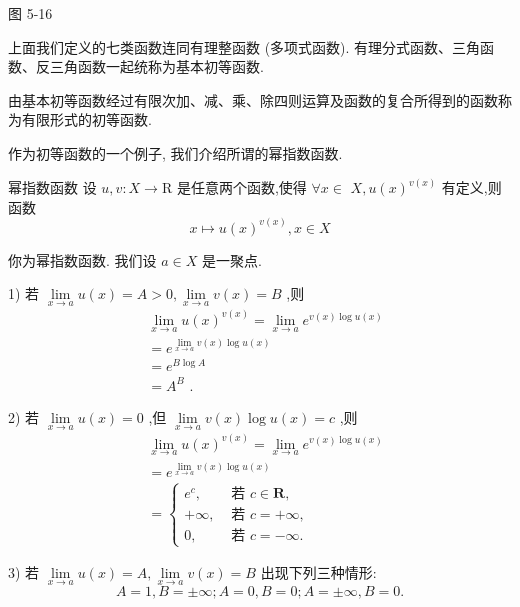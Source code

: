 图 5-16

上面我们定义的七类函数连同有理整函数 (多项式函数). 有理分式函数、三角函数、反三角函数一起统称为基本初等函数.

由基本初等函数经过有限次加、减、乘、除四则运算及函数的复合所得到的函数称为有限形式的初等函数.

作为初等函数的一个例子, 我们介绍所谓的幂指数函数.

幂指数函数 设 $u,v : X \rightarrow  \mathrm{R}$ 是任意两个函数,使得 $\forall x \in$  $X,u{\left( x\right) }^{v\left( x\right) }$ 有定义,则函数
$$x \mapsto  u{\left( x\right) }^{v\left( x\right) },x \in  X$$

你为幂指数函数. 我们设 $a \in  X$ 是一聚点.

1) 若 $\mathop{\lim }\limits_{{x \rightarrow  a}}u\left( x\right)  = A > 0,\mathop{\lim }\limits_{{x \rightarrow  a}}v\left( x\right)  = B$ ,则
\begin{align*}
	&\mathop{\lim }\limits_{{x \rightarrow  a}}u{\left( x\right) }^{v\left( x\right) } = \mathop{\lim }\limits_{{x \rightarrow  a}}{e}^{v\left( x\right) \log u\left( x\right) }\\
	&= {e}^{\mathop{\lim }\limits_{{x \rightarrow  a}}v\left( x\right) \log u\left( x\right) }\\
	&= {e}^{B\log A}\\
	&= {A}^{B}\text{ . }
\end{align*}

2) 若 $\mathop{\lim }\limits_{{x \rightarrow  a}}u\left( x\right)  = 0$ ,但 $\mathop{\lim }\limits_{{x \rightarrow  a}}v\left( x\right) \log u\left( x\right)  = c$ ,则
\begin{align*}
	&\mathop{\lim }\limits_{{x \rightarrow  a}}u{\left( x\right) }^{v\left( x\right) } = \mathop{\lim }\limits_{{x \rightarrow  a}}{e}^{v\left( x\right) \log u\left( x\right) }\\
	&= {e}^{\mathop{\lim }\limits_{{x \rightarrow  a}}v\left( x\right) \log u\left( x\right) }\\
	&= \left\{  \begin{array}{ll} {e}^{c}, & \text{ 若 }c \in  \mathbf{R}, \\   + \infty , & \text{ 若 }c =  + \infty , \\  0, & \text{ 若 }c =  - \infty . \end{array}\right.
\end{align*}

3) 若 $\mathop{\lim }\limits_{{x \rightarrow  a}}u\left( x\right)  = A,\mathop{\lim }\limits_{{x \rightarrow  a}}v\left( x\right)  = B$ 出现下列三种情形:
$$A = 1,B =  \pm  \infty ;A = 0,B = 0;A =  \pm  \infty ,B = 0.$$

